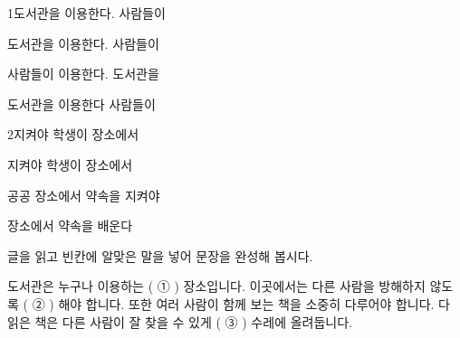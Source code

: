 \documentclass[fs13,seriesSau]{korfarm-base}
\begin{document}
\kfActivityBg \par{}
\par{}\par\nopagebreak[4]\smallskip\nopagebreak[4]
\begin{kfSentenceUnit}{1}{도서관을 이용한다. 사람들이}
\begin{kfChoices}
\kfChoice 도서관을
\kfChoice 이용한다.
\kfChoice 사람들이
\end{kfChoices}
\begin{kfChoices}
\kfChoice 사람들이
\kfChoice 이용한다.
\kfChoice 도서관을
\end{kfChoices}
\begin{kfChoices}
\kfChoice 도서관을
\kfChoice 이용한다
\kfChoice 사람들이
\end{kfChoices}
\end{kfSentenceUnit}

\begin{kfSentenceUnit}{2}{지켜야 학생이 장소에서}
\begin{kfChoices}
\kfChoice 지켜야
\kfChoice 학생이
\kfChoice 장소에서
\end{kfChoices}
\begin{kfChoices}
\kfChoice 공공 장소에서
\kfChoice 약속을
\kfChoice 지켜야
\end{kfChoices}
\begin{kfChoices}
\kfChoice 장소에서
\kfChoice 약속을
\kfChoice 배운다
\end{kfChoices}
\end{kfSentenceUnit}

\kfActivityBg \par{}\par\nopagebreak[4]\smallskip\nopagebreak[4]
\begin{kfBlankList}
\kfBlankItem 글을 읽고 빈칸에 알맞은 말을 넣어 문장을 완성해 봅시다.

도서관은 누구나 이용하는 ( ① ) 장소입니다. 이곳에서는 다른 사람을 방해하지 않도록 ( ② ) 해야 합니다. 또한 여러 사람이 함께 보는 책을 소중히 다루어야 합니다. 다 읽은 책은 다른 사람이 잘 찾을 수 있게 ( ③ ) 수레에 올려둡니다.
\end{kfBlankList}
\end{document}
